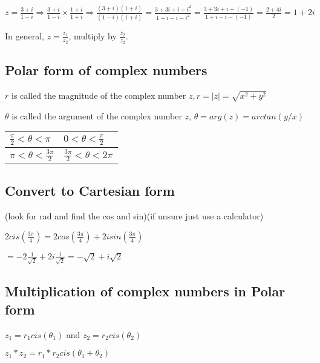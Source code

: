 \documentclass{extarticle}
\begin{document}
$z=\frac{3+i}{1-i}\Rightarrow\frac{3+i}{1-i}\times\frac{1+i}{1+i}\Rightarrow\frac{\left(3+i\right)\left(1+i\right)}{\left(1-i\right)\left(1+i\right)}=\frac{3+3i+i+i^2}{1+i-i-i^2}=\frac{3+3i+i+(-1)}{1+i-i-(-1)}=\frac{2+4i}{2}=1+2i$

In general, $z=\frac{z_1}{z_2}$, multiply by $\frac{{\overline{z}}_2}{{\overline{z}}_2}$.

\subsection{Polar form of complex numbers}

$r$ is called the magnitude of the complex number $z, r=\left|z\right|=\sqrt{x^2+y^2}$

$\theta$ is called the argument of the complex number $z$, $\theta=arg\left(z\right)=arctan{\left(y/x\right)}$

\begin{tabu}{|X|X|}
    \hline
$\frac{\pi}{2}<\theta<\pi$ & $0<\theta<\frac{\pi}{2}$ \\ \hline
$\pi<\theta<\frac{3\pi}{2}$ & $\frac{3\pi}{2}<\theta<2\pi$ \\ \hline
    \end{tabu}







\subsection{Convert to Cartesian form}

(look for rad and find the cos and sin)(if unsure just use a calculator)

$2cis\left(\frac{3\pi}{4}\right)=2cos{\left(\frac{3\pi}{4}\right)}+2isin{\left(\frac{3\pi}{4}\right)}$

$=-2\frac{1}{\sqrt2}+2i\frac{1}{\sqrt2}=-\sqrt2+i\sqrt2$

\subsection{Multiplication of complex numbers in Polar form}

$z_1=r_1cis\left(\theta_1\right)$ and $z_2=r_2cis\left(\theta_2\right)$

$z_1\ast z_2=r_1\ast r_2cis\left(\theta_1+\theta_2\right)$
\end{document}
